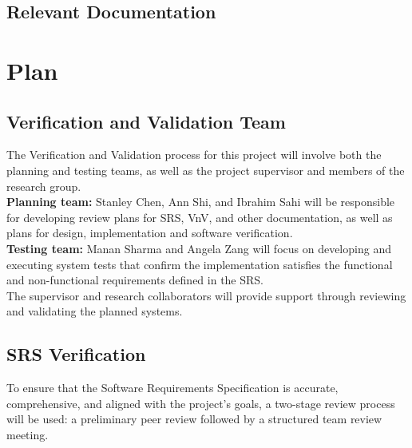 \documentclass[12pt, titlepage]{article}
\begin{document}
\subsection{Relevant Documentation}


\citet{SRS}


\section{Plan}

\subsection{Verification and Validation Team}

The Verification and Validation process for this project will involve both the planning and testing teams, as well as the project supervisor and members of the research group.\\

\textbf{Planning team:} Stanley Chen, Ann Shi, and Ibrahim Sahi will be responsible for developing review plans for SRS, VnV, and other documentation, as well as plans for design, implementation and software verification.\\

\textbf{Testing team:} Manan Sharma and Angela Zang will focus on developing and executing system tests that confirm the implementation satisfies the functional and non-functional requirements defined in the SRS.\\

The supervisor and research collaborators will provide support through reviewing and validating the planned systems.

\subsection{SRS Verification}

To ensure that the Software Requirements Specification is accurate, comprehensive, and aligned with the project’s goals, a two-stage review process will be used: a preliminary peer review followed by a structured team review meeting.\\
\end{document}
